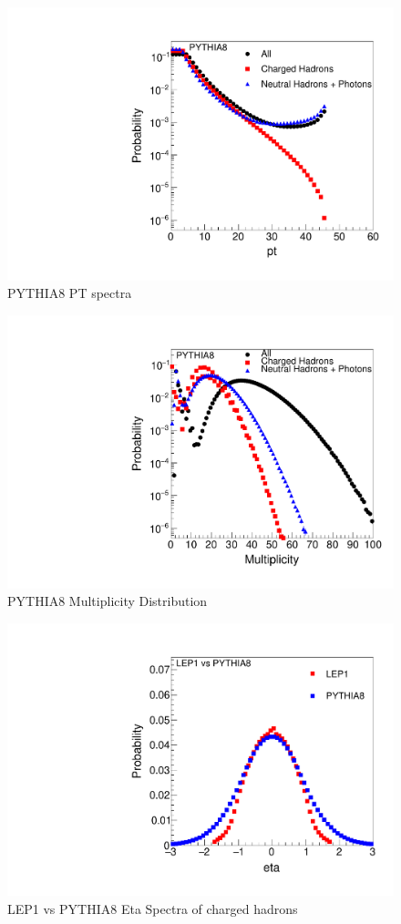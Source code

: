 \begin{figure}[H]
\begin{center}
\includegraphics[width=.45\textwidth]{images/DataQualityCheck/PYTHIA8_pt.pdf}
\caption{PYTHIA8 PT spectra}
\label{fig:figure8} 
\end{center}
\end{figure}

\begin{figure}[H]
\begin{center}
\includegraphics[width=.45\textwidth]{images/DataQualityCheck/PYTHIA8_mult.pdf}
\caption{PYTHIA8 Multiplicity Distribution}
\label{fig:figure9} 
\end{center}
\end{figure}

\begin{figure}[H]
\begin{center}
\includegraphics[width=.45\textwidth]{images/DataQualityCheck/eta_LEP1_PYTHIA8.pdf}
\caption{LEP1 vs PYTHIA8 Eta Spectra of charged hadrons}
\label{fig:figure10} 
\end{center}
\end{figure}

